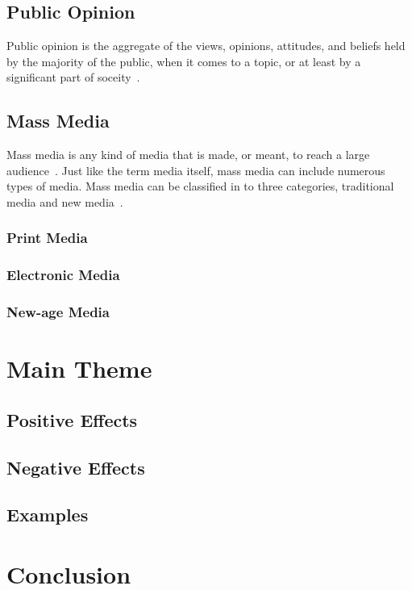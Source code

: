 \documentclass[a4paper,12pt]{article}
\begin{document}
\subsection{Public Opinion}
Public opinion is the aggregate of the views, opinions, attitudes, and beliefs held by the majority of the public,
when it comes to a topic, or at least by a significant part of soceity~\parencite{davison2024public}.
\subsection{Mass Media}
Mass media is any kind of media that is made, or meant, to reach a large audience~\parencite{duignan2024mass}.
Just like the term media itself, mass media can include numerous types of media.
Mass media can be classified in to three categories, traditional media and new media~\parencite{manohar2008different}.
\subsubsection{Print Media}
\subsubsection{Electronic Media}
\subsubsection{New-age Media}

\section{Main Theme}
\subsection{Positive Effects}
\subsection{Negative Effects}
\subsection{Examples}

\section{Conclusion}

\newpage
\printbibliography
\end{document}
